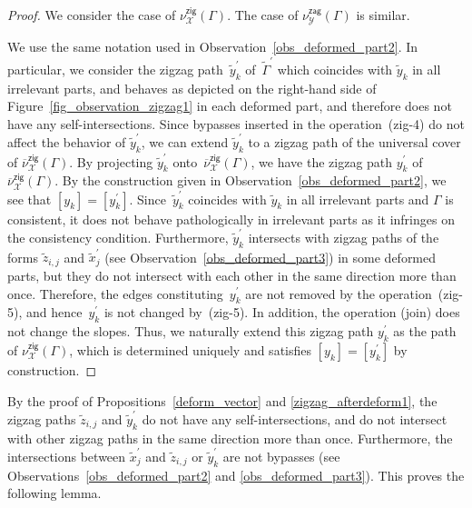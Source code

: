 \documentclass[11pt]{article}
\numberwithin{equation}{section}
\numberwithin{equation}{section}
\numberwithin{figure}{section}
\numberwithin{table}{section}
\newcommand{\calX}{\mathcal{X}}
\newcommand{\calY}{\mathcal{Y}}
\newcommand{\zig}{\mathsf{zig}}
\newcommand{\zag}{\mathsf{zag}}
\begin{document}
\begin{proof}We consider the case of $\nu^\zig_\calX(\Gamma)$. The case of $\nu^\zag_\calY(\Gamma)$ is similar.

We use the same notation used in Observation~\ref{obs_deformed_part2}.
In particular, we consider the zigzag path~$\widetilde{y}^\prime_k$ of~$\widetilde{\Gamma}^\prime$ which coincides with $\widetilde{y}_k$ in all irrelevant parts, and behaves as depicted on the right-hand side of Figure~\ref{fig_observation_zigzag1} in each deformed part,
and therefore does not have any self-intersections.
Since bypasses inserted in the operation~(zig-4) do not affect the behavior of $\widetilde{y}^\prime_k$, we can extend $\widetilde{y}^\prime_k$ to a zigzag path of the universal cover of $\overline{\nu}^\zig_\calX(\Gamma)$.
By projecting $\widetilde{y}^\prime_k$ onto~$\overline{\nu}^\zig_\calX(\Gamma)$, we have the zigzag path $y_k^\prime$ of $\overline{\nu}^\zig_\calX(\Gamma)$.
By the construction given in Observation~\ref{obs_deformed_part2}, we see that $[y_k]=[y_k^\prime]$.
Since~$\widetilde{y}^\prime_k$ coincides with $\widetilde{y}_k$ in all irrelevant parts and $\Gamma$ is consistent, it does not behave pathologically in irrelevant parts as it infringes on the consistency condition.
Furthermore, $\widetilde{y}^\prime_k$ intersects with zigzag paths of the forms $\widetilde{z}_{i,j}$ and $\widetilde{x}^\prime_j$ (see Observation~\ref{obs_deformed_part3}) in some deformed parts, but they do not intersect with each other in the same direction more than once.
Therefore, the edges constituting~$y_k^\prime$ are not removed by the operation~(zig-5), and hence~$y_k^\prime$ is not changed by~(zig-5).
In addition, the operation (join) does not change the slopes.
Thus, we naturally extend this zigzag path $y_k^\prime$ as the path of $\nu^\zig_\calX(\Gamma)$, which is determined uniquely and satisfies $[y_k]=[y_k^\prime]$ by construction.
\end{proof}

By the proof of Propositions~\ref{deform_vector} and \ref{zigzag_afterdeform1}, the zigzag paths $\widetilde{z}_{i,j}$
and $\widetilde{y}^\prime_k$ do not have any self-intersections,
and do not intersect with other zigzag paths in the same direction more than once.
Furthermore, the intersections between $\widetilde{x}^\prime_j$ and $\widetilde{z}_{i,j}$ or $\widetilde{y}^\prime_k$ are not bypasses
(see Observations~\ref{obs_deformed_part2} and \ref{obs_deformed_part3}). This proves the following lemma.
\end{document}
